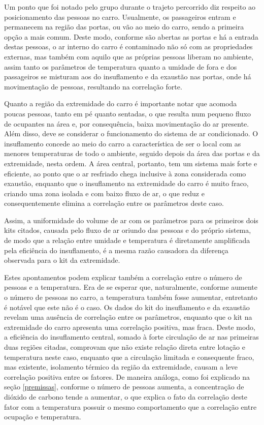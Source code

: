 \documentclass[acronym,symbols,table]{fei}
\begin{document}
Um ponto que foi notado pelo grupo durante o trajeto percorrido diz respeito ao posicionamento das pessoas no carro. Usualmente, os passageiros entram e permanecem na região das portas, ou vão ao meio do carro, sendo a primeira opção a mais comum. Deste modo, conforme são abertas as portas e há a entrada destas pessoas, o ar interno do carro é contaminado não só com as propriedades externas, mas também com aquilo que as próprias pessoas liberam no ambiente, assim tanto os parâmetros de temperatura quanto a umidade de fora e dos passageiros se misturam aos do insuflamento e da exaustão nas portas, onde há movimentação de pessoas, resultando na correlação forte.

Quanto a região da extremidade do carro é importante notar que acomoda poucas pessoas, tanto em pé quanto sentadas, o que resulta num pequeno fluxo de ocupantes na área e, por consequência, baixa movimentação do ar presente. Além disso, deve se considerar o funcionamento do sistema de ar condicionado. O insuflamento concede ao meio do carro a característica de ser o local com as menores temperaturas de todo o ambiente, seguido depois da área das portas e da extremidade, nesta ordem. A área central, portanto, tem um sistema mais forte e eficiente, ao ponto que o ar resfriado chega inclusive à zona considerada como exaustão, enquanto que o insuflamento na extremidade do carro é muito fraco, criando uma zona isolada e com baixo fluxo de ar, o que reduz e consequentemente elimina a correlação entre os parâmetros deste caso. 

Assim, a uniformidade do volume de ar com os parâmetros para os primeiros dois kits citados, causada pelo fluxo de ar oriundo das pessoas e do próprio sistema, de modo que a relação entre umidade e temperatura é diretamente amplificada pela eficiência do insuflamento, é a mesma razão causadora da diferença observada para o kit da extremidade. 

Estes apontamentos podem explicar também a correlação entre o número de pessoas e a temperatura. Era de se esperar que, naturalmente, conforme aumente o número de pessoas no carro, a temperatura também fosse aumentar, entretanto é notável que este não é o caso. Os dados do kit do insuflamento e da exaustão revelam uma ausência de correlação entre os parâmetros, enquanto que o kit na extremidade do carro apresenta uma correlação positiva, mas fraca. Deste modo, a eficiência do insuflamento central, somado à forte circulação de ar nas primeiras duas regiões citadas, comprovam que não existe relação direta entre lotação e temperatura neste caso, enquanto que a circulação limitada e consequente fraco, mas existente, isolamento térmico da região da extremidade, causam a leve correlação positiva entre os fatores. De maneira análoga, como foi explicado na seção \ref{premissas}, conforme o número de pessoas aumenta, a concentração de dióxido de carbono tende a aumentar, o que explica o fato da correlação deste fator com a temperatura possuir o mesmo comportamento que a correlação entre ocupação e temperatura.
\end{document}
